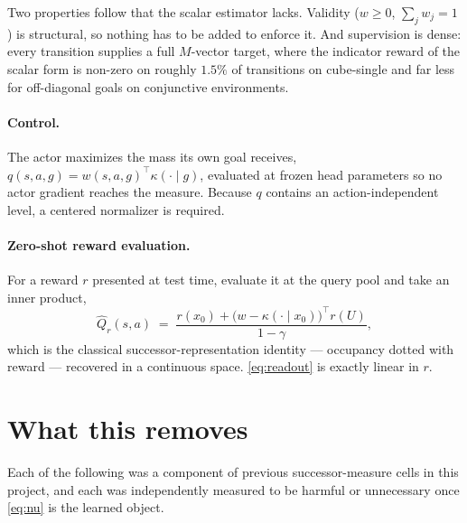 \documentclass{article}
\begin{document}
Two properties follow that the scalar estimator lacks. Validity ($w\ge0$, $\sum_j w_j=1$)
is structural, so nothing has to be added to enforce it. And supervision is dense: every
transition supplies a full $M$-vector target, where the indicator reward of the scalar form
is non-zero on roughly $1.5\%$ of transitions on cube-single and far less for off-diagonal
goals on conjunctive environments.

\paragraph{Control.} The actor maximizes the mass its own goal receives,
$q(s,a,g)=w(s,a,g)^{\top}\kappa(\cdot\mid g)$, evaluated at frozen head parameters so no
actor gradient reaches the measure. Because $q$ contains an action-independent level, a
centered normalizer is required.

\paragraph{Zero-shot reward evaluation.} For a reward $r$ presented at test time, evaluate
it at the query pool and take an inner product,
\begin{equation}
\widehat{Q}_r(s,a) \;=\; \frac{r(x_0) + \big(w - \kappa(\cdot\mid x_0)\big)^{\top} r(U)}{1-\gamma},
\label{eq:readout}
\end{equation}
which is the classical successor-representation identity --- occupancy dotted with reward
--- recovered in a continuous space. \eqref{eq:readout} is exactly linear in $r$.

\section{What this removes}

Each of the following was a component of previous successor-measure cells in this project,
and each was independently measured to be harmful or unnecessary once \eqref{eq:nu} is the
learned object.
\end{document}
